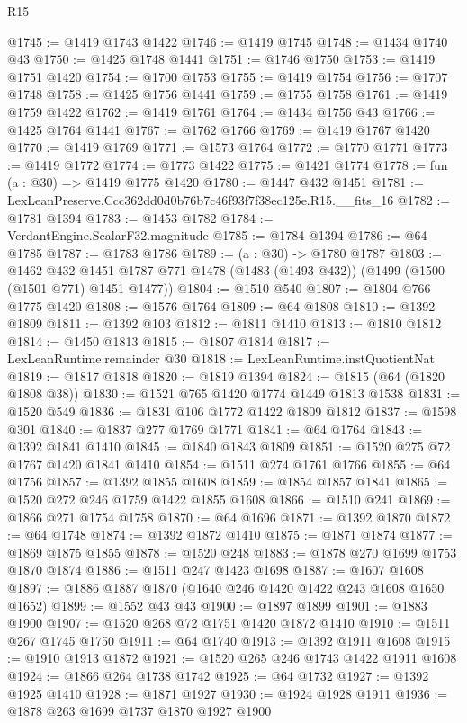 \begin{lexlean}{R15}
\begin{coremodule}
@1745 := @1419 @1743 @1422
@1746 := @1419 @1745
@1748 := @1434 @1740 @43
@1750 := @1425 @1748 @1441
@1751 := @1746 @1750
@1753 := @1419 @1751 @1420
@1754 := @1700 @1753
@1755 := @1419 @1754
@1756 := @1707 @1748
@1758 := @1425 @1756 @1441
@1759 := @1755 @1758
@1761 := @1419 @1759 @1422
@1762 := @1419 @1761
@1764 := @1434 @1756 @43
@1766 := @1425 @1764 @1441
@1767 := @1762 @1766
@1769 := @1419 @1767 @1420
@1770 := @1419 @1769
@1771 := @1573 @1764
@1772 := @1770 @1771
@1773 := @1419 @1772
@1774 := @1773 @1422
@1775 := @1421 @1774
@1778 := fun (a : @30) => @1419 @1775 @1420
@1780 := @1447 @432 @1451
@1781 := LexLeanPreserve.Ccc362dd0d0b76b7c46f93f7f38ec125e.R15.__fits_16
@1782 := @1781 @1394
@1783 := @1453 @1782
@1784 := VerdantEngine.ScalarF32.magnitude
@1785 := @1784 @1394
@1786 := @64 @1785
@1787 := @1783 @1786
@1789 := (a : @30) -> @1780 @1787
@1803 := @1462
    @432
    @1451
    @1787
    @771
    @1478
    (@1483 (@1493 @432))
    (@1499 (@1500 (@1501 @771) @1451 @1477))
@1804 := @1510 @540
@1807 := @1804 @766 @1775 @1420
@1808 := @1576 @1764
@1809 := @64 @1808
@1810 := @1392 @1809
@1811 := @1392 @103
@1812 := @1811 @1410
@1813 := @1810 @1812
@1814 := @1450 @1813
@1815 := @1807 @1814
@1817 := LexLeanRuntime.remainder @30
@1818 := LexLeanRuntime.instQuotientNat
@1819 := @1817 @1818
@1820 := @1819 @1394
@1824 := @1815 (@64 (@1820 @1808 @38))
@1830 := @1521 @765 @1420 @1774 @1449 @1813 @1538
@1831 := @1520 @549
@1836 := @1831 @106 @1772 @1422 @1809 @1812
@1837 := @1598 @301
@1840 := @1837 @277 @1769 @1771
@1841 := @64 @1764
@1843 := @1392 @1841 @1410
@1845 := @1840 @1843 @1809
@1851 := @1520 @275 @72 @1767 @1420 @1841 @1410
@1854 := @1511 @274 @1761 @1766
@1855 := @64 @1756
@1857 := @1392 @1855 @1608
@1859 := @1854 @1857 @1841
@1865 := @1520 @272 @246 @1759 @1422 @1855 @1608
@1866 := @1510 @241
@1869 := @1866 @271 @1754 @1758
@1870 := @64 @1696
@1871 := @1392 @1870
@1872 := @64 @1748
@1874 := @1392 @1872 @1410
@1875 := @1871 @1874
@1877 := @1869 @1875 @1855
@1878 := @1520 @248
@1883 := @1878 @270 @1699 @1753 @1870 @1874
@1886 := @1511 @247 @1423 @1698
@1887 := @1607 @1608
@1897 := @1886 @1887 @1870 (@1640 @246 @1420 @1422 @243 @1608 @1650 @1652)
@1899 := @1552 @43 @43
@1900 := @1897 @1899
@1901 := @1883 @1900
@1907 := @1520 @268 @72 @1751 @1420 @1872 @1410
@1910 := @1511 @267 @1745 @1750
@1911 := @64 @1740
@1913 := @1392 @1911 @1608
@1915 := @1910 @1913 @1872
@1921 := @1520 @265 @246 @1743 @1422 @1911 @1608
@1924 := @1866 @264 @1738 @1742
@1925 := @64 @1732
@1927 := @1392 @1925 @1410
@1928 := @1871 @1927
@1930 := @1924 @1928 @1911
@1936 := @1878 @263 @1699 @1737 @1870 @1927 @1900

\end{coremodule}
\end{lexlean}
